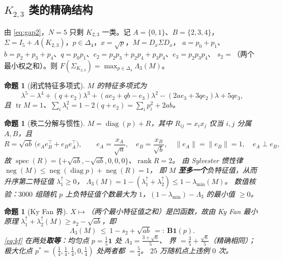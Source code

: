 \documentclass[UTF8,11pt]{ctexart}
\newtheorem{proposition}[theorem]{命题}
\theoremstyle{definition}
\newcommand{\Lam}{\Lambda}
\newcommand{\tr}{\operatorname{tr}}
\newcommand{\rank}{\operatorname{rank}}
\newcommand{\one}{\mathbf{1}}
\begin{document}
\subsection{$K_{2,3}$ 类的精确结构}\label{sec:k23}

由 \eqref{eq:gap2}，$N=5$ 只剩 $K_{2,3}$ 一类。记 $A=\{0,1\}$、$B=\{2,3,4\}$，
$\Sigma=I_5+A(K_{2,3})$，$p\in\Delta_4$，$x=\sqrt p$，$M=D_x\Sigma D_x$，
$a=p_0+p_1$、$b=p_2+p_3+p_4$、$q=p_0p_1$、$e_2=p_2p_3+p_2p_4+p_3p_4$、$e_3=p_2p_3p_4$、
$s_2=$（两个最小权之和）。则 $F(\Sigma_{K_{2,3}})=\max_{p\in\Delta_4}\Lam_3(M)$。

\begin{proposition}[闭式特征多项式]\label{prop:k23poly}
$M$ 的特征多项式为
\[
\lambda^5-\lambda^4+(q+e_2)\lambda^3+(ae_2+qb-e_3)\lambda^2-(2ae_3+3qe_2)\lambda+5qe_3,
\]
且 $\tr M=1$、$\sum_i\lambda_i^2=1-2(q+e_2)=\sum_ip_i^2+2ab$。
\end{proposition}

\begin{proposition}[秩二分解与惯性]\label{prop:k23rank2}
$M=\operatorname{diag}(p)+R$，其中 $R_{ij}=x_ix_j$ 仅当 $i,j$ 分属 $A,B$，且
\[
R=\sqrt{ab}\,\bigl(e_Ae_B^\top+e_Be_A^\top\bigr),\qquad
e_A=\frac{x_A}{\sqrt a},\quad e_B=\frac{x_B}{\sqrt b},\quad \|e_A\|=\|e_B\|=1,\quad e_A\perp e_B,
\]
故 $\operatorname{spec}(R)=\{+\sqrt{ab},-\sqrt{ab},0,0,0\}$、$\rank R=2$。
由 Sylvester 惯性律 $\operatorname{neg}(M)\le\operatorname{neg}(\operatorname{diag}p)+\operatorname{neg}(R)=1$，
即 $M$ \textbf{至多一个}负特征值，从而升序第二特征值 $\lambda_1^{\uparrow}\ge0$，
$\Lam_3(M)=1-(\lambda_1^{\uparrow}+\lambda_2^{\uparrow})\le1-\lambda_{\min}(M)$。
数值核验：$3000$ 组随机 $p$ 上负特征值个数最大为 $1$，$(1-\lambda_{\min})-\Lam_3$ 的最小值 $\ge0$。
\end{proposition}

\begin{proposition}[Ky Fan 界]\label{prop:k23kyfan}
$X\mapsto$（两个最小特征值之和）是凹函数，故由 Ky Fan 最小原理
$\lambda_1^{\uparrow}+\lambda_2^{\uparrow}(M)\ge s_2-\sqrt{ab}$，即
\begin{equation}\label{eq:kf}
\Lam_3(M)\ \le\ 1-s_2+\sqrt{ab}\ =:\ \mathbf{B1}(p).
\end{equation}
\eqref{eq:kf} 在两处\textbf{取等}：均匀点 $p=\frac15\one$ 处 $\Lam_3=\frac{3+\sqrt6}{5}$、
界 $=\frac35+\frac{\sqrt6}5$（精确相同）；极大化点 $p^\ast=(\frac14,\frac14,\frac14,0,\frac14)$ 处两者都 $=\frac54$。
$25$ 万随机点上违例 $0$ 次。
\end{proposition}
\end{document}
